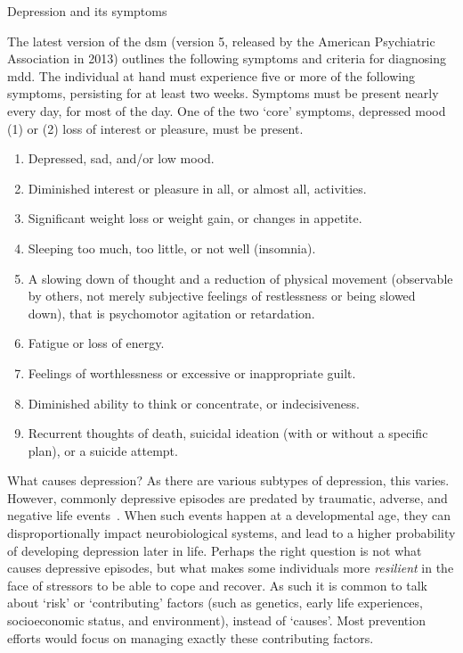 \begin{mybox}[floatplacement=t,fontupper=\footnotesize,fontlower=\footnotesize,label={box:depression},colback=White]{Depression and its symptoms}

  The latest version of the \gls{dsm} (version 5, released by the American Psychiatric Association in 2013) outlines the following symptoms and criteria for diagnosing \gls{mdd}.
  The individual at hand must experience five or more of the following symptoms, persisting for at least two weeks.
  Symptoms must be present nearly every day, for most of the day.
  One of the two `core' symptoms, depressed mood (1) or (2) loss of interest or pleasure, must be present.

  \tcblower

  \begin{enumerate}
    \item Depressed, sad, and/or low mood.
    \item Diminished interest or pleasure in all, or almost all, activities.
    \item Significant weight loss or weight gain, or changes in appetite.
    \item Sleeping too much, too little, or not well (insomnia).
    \item A slowing down of thought and a reduction of physical movement (observable by others, not merely subjective feelings of restlessness or being slowed down), that is psychomotor agitation or retardation.
    \item Fatigue or loss of energy.
    \item Feelings of worthlessness or excessive or inappropriate guilt.
    \item Diminished ability to think or concentrate, or indecisiveness.
    \item Recurrent thoughts of death, suicidal ideation (with or without a specific plan), or a suicide attempt.
  \end{enumerate}

\end{mybox}

What causes depression?
As there are various subtypes of depression, this varies.
However, commonly depressive episodes are predated by traumatic, adverse, and negative life events~\parencite{Kessler1997, Monroe2008}.
When such events happen at a developmental age, they can disproportionally impact neurobiological systems, and lead to a higher probability of developing depression later in life.
Perhaps the right question is not what causes depressive episodes, but what makes some individuals more \emph{resilient} in the face of stressors to be able to cope and recover.
As such it is common to talk about `risk' or `contributing' factors (such as genetics, early life experiences, socioeconomic status, and environment), instead of `causes'.
Most prevention efforts would focus on managing exactly these contributing factors.

